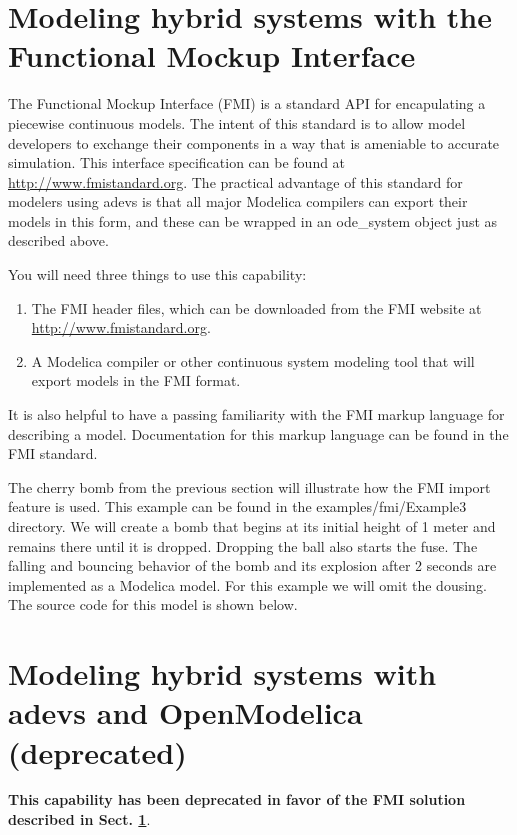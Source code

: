 \section{Modeling hybrid systems with the Functional Mockup Interface}
\label{sect:fmi}
The Functional Mockup Interface (FMI) is a standard API for encapulating a piecewise continuous models. The intent of this standard is to allow model developers to exchange their components in a way that is ameniable to accurate simulation. This interface specification can be found at \url{http://www.fmistandard.org}. The practical advantage of this standard for modelers using adevs is that all major Modelica compilers can export their models in this form, and these can be wrapped in an ode\_system object just as described above.

You will need three things to use this capability:
\begin{enumerate}
\item The FMI header files, which can be downloaded from the FMI website at \url{http://www.fmistandard.org}.
\item A Modelica compiler or other continuous system modeling tool that will export models in the FMI format.
\end{enumerate}
It is also helpful to have a passing familiarity with the FMI markup language for describing a model. Documentation for this markup language can be found in the FMI standard.

The cherry bomb from the previous section will illustrate how the FMI import feature is used. This example can be found in the examples/fmi/Example3 directory. We will create a bomb that begins at its initial height of 1 meter and remains there until it is dropped. Dropping the ball also starts the fuse. The falling and bouncing behavior of the bomb and its explosion after 2 seconds are implemented as a Modelica model. For this example we will omit the dousing. The source code for this model is shown below.

\section{Modeling hybrid systems with adevs and OpenModelica (deprecated)}

{\bf This capability has been deprecated in favor of the FMI solution described in Sect. \ref{sect:fmi}}.

